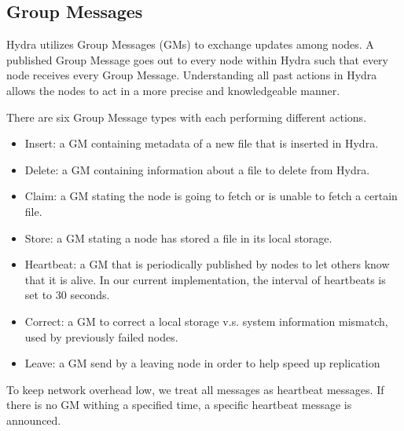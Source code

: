 \subsection{Group Messages} \label{sec:group-messages}
Hydra utilizes Group Messages (GMs) to exchange updates among nodes.
A published Group Message goes out to every node within Hydra such that every node receives every Group Message. %
Understanding  all past actions in Hydra allows the nodes to act in a more precise and knowledgeable manner.

There are six Group Message types with each performing different actions. %
\begin{itemize}
    \item Insert: a GM containing metadata of a new file that is inserted in Hydra.
    \item Delete: a GM containing information about a file to delete from Hydra.
    \item Claim: a GM stating the node is going to fetch or is unable to fetch a certain file.
    \item Store: a GM stating a node has stored a file in its local storage. %
    \item Heartbeat: a GM that is periodically published by nodes to let others know that it is alive. In our current implementation, the interval of heartbeats is set to 30 seconds. %
    \item Correct: a GM to correct a local storage v.s. system information mismatch, used by previously failed nodes. 
    \item Leave: a GM send by a leaving node in order to help speed up replication
\end{itemize}

To keep network overhead low, we treat all messages as heartbeat messages. If there is no GM withing a specified time, a specific heartbeat message is announced.
